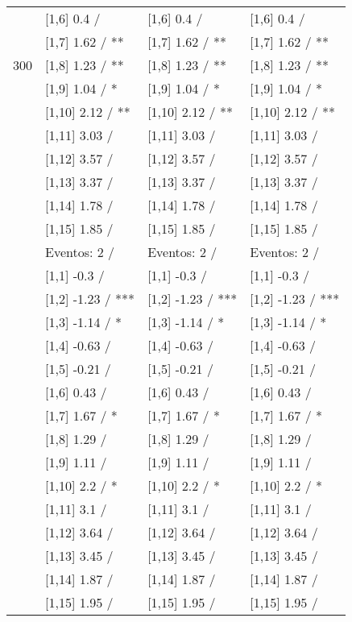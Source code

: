 \begin{table}
\begin{tabular}[t]{llll}
 & {}[1,6] 0.4  / & {}[1,6] 0.4  / & {}[1,6] 0.4  /\\
 & {}[1,7] 1.62  / ** & {}[1,7] 1.62  / ** & {}[1,7] 1.62  / **\\
300 & {}[1,8] 1.23  / ** & {}[1,8] 1.23  / ** & {}[1,8] 1.23  / **\\
\addlinespace
 & {}[1,9] 1.04  / * & {}[1,9] 1.04  / * & {}[1,9] 1.04  / *\\
 & {}[1,10] 2.12  / ** & {}[1,10] 2.12  / ** & {}[1,10] 2.12  / **\\
 & {}[1,11] 3.03  / & {}[1,11] 3.03  / & {}[1,11] 3.03  /\\
 & {}[1,12] 3.57  / & {}[1,12] 3.57  / & {}[1,12] 3.57  /\\
 & {}[1,13] 3.37  / & {}[1,13] 3.37  / & {}[1,13] 3.37  /\\
\addlinespace
 & {}[1,14] 1.78  / & {}[1,14] 1.78  / & {}[1,14] 1.78  /\\
 & {}[1,15] 1.85  / & {}[1,15] 1.85  / & {}[1,15] 1.85  /\\
 & Eventos:  2 / & Eventos:  2 / & Eventos:  2 /\\
 & {}[1,1] -0.3  / & {}[1,1] -0.3  / & {}[1,1] -0.3  /\\
 & {}[1,2] -1.23  / *** & {}[1,2] -1.23  / *** & {}[1,2] -1.23  / ***\\
\addlinespace
 & {}[1,3] -1.14  / * & {}[1,3] -1.14  / * & {}[1,3] -1.14  / *\\
 & {}[1,4] -0.63  / & {}[1,4] -0.63  / & {}[1,4] -0.63  /\\
 & {}[1,5] -0.21  / & {}[1,5] -0.21  / & {}[1,5] -0.21  /\\
 & {}[1,6] 0.43  / & {}[1,6] 0.43  / & {}[1,6] 0.43  /\\
 & {}[1,7] 1.67  / * & {}[1,7] 1.67  / * & {}[1,7] 1.67  / *\\
\addlinespace
500 & {}[1,8] 1.29  / & {}[1,8] 1.29  / & {}[1,8] 1.29  /\\
 & {}[1,9] 1.11  / & {}[1,9] 1.11  / & {}[1,9] 1.11  /\\
 & {}[1,10] 2.2  / * & {}[1,10] 2.2  / * & {}[1,10] 2.2  / *\\
 & {}[1,11] 3.1  / & {}[1,11] 3.1  / & {}[1,11] 3.1  /\\
 & {}[1,12] 3.64  / & {}[1,12] 3.64  / & {}[1,12] 3.64  /\\
\addlinespace
 & {}[1,13] 3.45  / & {}[1,13] 3.45  / & {}[1,13] 3.45  /\\
 & {}[1,14] 1.87  / & {}[1,14] 1.87  / & {}[1,14] 1.87  /\\
 & {}[1,15] 1.95  / & {}[1,15] 1.95  / & {}[1,15] 1.95  /\\
\bottomrule
\end{tabular}
\end{table}
